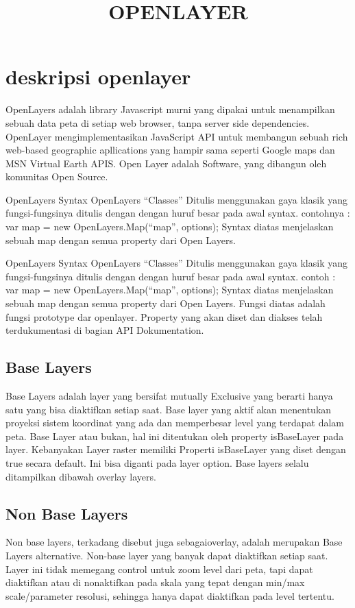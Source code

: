 \documentclass{article}
\title{OPENLAYER}
\begin{document}
\maketitle

\section{deskripsi openlayer}
OpenLayers adalah library Javascript murni yang dipakai untuk menampilkan sebuah data peta di setiap web browser, tanpa server side dependencies.
OpenLayer mengimplementasikan JavaScript API untuk membangun sebuah rich web-based geographic apllications yang hampir sama seperti Google maps dan MSN Virtual Earth APIS.
Open Layer adalah Software, yang dibangun oleh komunitas Open Source.
  
OpenLayers Syntax
OpenLayers “Classes”
Ditulis menggunakan gaya klasik yang fungsi-fungsinya ditulis dengan dengan huruf besar pada awal syntax.
contohnya : var map = new OpenLayers.Map(“map”, options);
Syntax diatas menjelaskan sebuah map dengan semua property dari Open Layers. 
  

  OpenLayers Syntax
  OpenLayers “Classes”
  Ditulis menggunakan gaya klasik yang fungsi-fungsinya ditulis dengan dengan huruf besar pada awal syntax.
  contoh : var map = new OpenLayers.Map(“map”, options);
  Syntax diatas menjelaskan sebuah map dengan semua property dari Open Layers.
  Fungsi diatas adalah fungsi prototype dar openlayer. Property yang akan diset dan diakses telah terdukumentasi di bagian API   Dokumentation.

\subsection{Base Layers}
 Base Layers adalah layer yang bersifat mutually Exclusive yang berarti hanya satu yang bisa diaktifkan setiap saat.
 Base layer yang aktif akan menentukan proyeksi sistem koordinat yang ada dan memperbesar level yang terdapat dalam peta. 
 Base Layer atau bukan, hal ini ditentukan oleh property isBaseLayer pada layer. Kebanyakan Layer raster memiliki Properti isBaseLayer yang diset dengan true secara default. 
 Ini bisa diganti pada layer option. Base layers selalu ditampilkan dibawah overlay layers.

\subsection{Non Base Layers}
Non base layers, terkadang disebut juga sebagaioverlay, adalah merupakan Base Layers alternative. Non-base layer yang banyak dapat diaktifkan setiap saat.
Layer ini tidak memegang control untuk zoom level dari peta, tapi dapat diaktifkan atau di nonaktifkan pada skala yang tepat dengan min/max scale/parameter resolusi, sehingga hanya dapat diaktifkan pada level tertentu.
\end{document}

